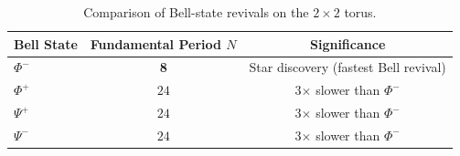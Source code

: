 \begin{table}[H]
\centering
\caption{Comparison of Bell-state revivals on the $2 \times 2$ torus.}
\label{tab:bell-comparison}
\begin{tabular}{lcc}
\toprule
\textbf{Bell State} & \textbf{Fundamental Period $N$} & \textbf{Significance} \\
\midrule
$\Phi^-$ & \textbf{8} & Star discovery (fastest Bell revival) \\
$\Phi^+$ & $24$ & 3$\times$ slower than $\Phi^-$ \\
$\Psi^+$ & $24$ & 3$\times$ slower than $\Phi^-$ \\
$\Psi^-$ & $24$ & 3$\times$ slower than $\Phi^-$ \\
\bottomrule
\end{tabular}
\end{table}
